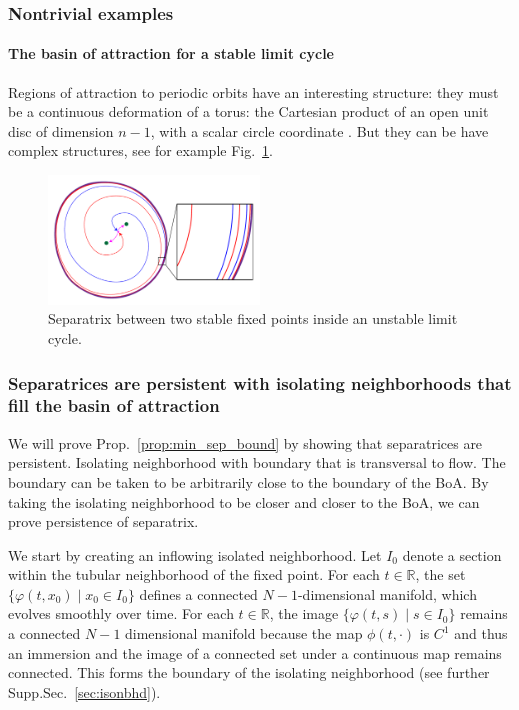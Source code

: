 \documentclass{article}
\theoremstyle{definition} \newtheorem{definition}{Definition}
\theoremstyle{remark} \newtheorem{remark}{Remark}
\newcommand{\reals}{\mathbb{R}}
\newcounter{ct}
\begin{document}
\subsubsection{Nontrivial examples}

\paragraph{The basin of attraction for a stable limit cycle}%
Regions of attraction to periodic orbits have an interesting structure: they must be a continuous deformation of a torus: the Cartesian product of an open unit disc of dimension $n-1$, with a scalar circle coordinate \citep{wilson1967structure}.
But they can be have complex structures, see for example Fig.~\ref{fig:unstab_lc_3fps}.

\setlength\belowcaptionskip{-5ex}
\begin{figure}
  \centering
  \includegraphics[width=0.5\textwidth]{unstab_lc_3fps}
  \caption{Separatrix between two stable fixed points inside an unstable limit cycle.
  }\label{fig:unstab_lc_3fps}
\end{figure}



\subsubsection{Separatrices are persistent with isolating neighborhoods that fill the basin of attraction}
We will prove Prop.~\ref{prop:min_sep_bound} by showing that separatrices are persistent.
Isolating neighborhood with boundary that is transversal to flow.
The boundary can be taken to be arbitrarily close to the boundary of the BoA.
By taking the isolating neighborhood to be closer and closer to the BoA, we can prove persistence of separatrix.

We start by creating an inflowing isolated neighborhood.
 Let $I_0$ denote a section within the tubular neighborhood of the fixed point.
For each $t\in\reals$, the set $\{\varphi(t,x_0) \mid x_0\in I_0\}$ defines a connected $N-1$-dimensional manifold, which evolves smoothly over time. 
For each \( t \in \reals \), the image \( \{ \varphi(t, s) \mid s \in I_0 \} \) remains a connected $N-1$ dimensional manifold because the map \( \phi(t, \cdot) \) is \( C^1 \) and thus an immersion and the image of a connected set under a continuous map remains connected.
This forms the boundary of the isolating neighborhood (see further Supp.Sec.~\ref{sec:isonbhd}).
\end{document}
